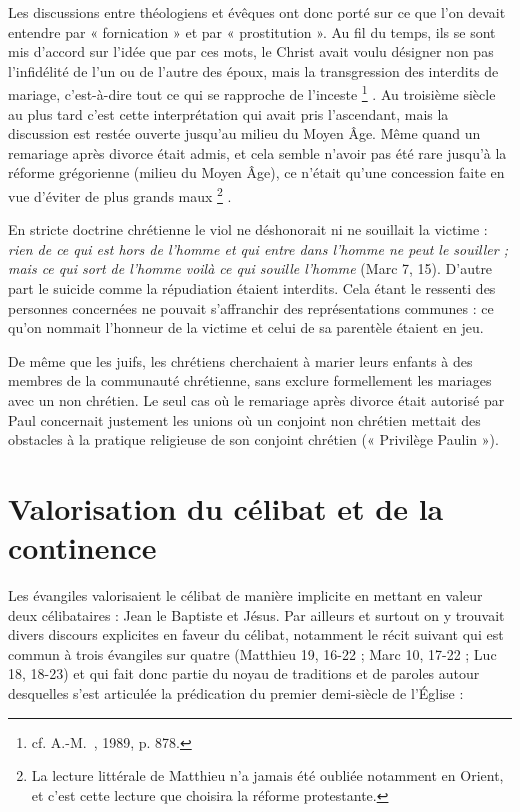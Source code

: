  Les discussions entre théologiens et évêques ont donc porté sur ce que l'on devait entendre par « fornication » et par « prostitution ». Au fil du temps, ils se sont mis d'accord sur l'idée que par ces mots, le Christ avait voulu désigner non pas l'infidélité de l'un ou de l'autre des époux, mais la transgression des interdits de mariage, c'est-à-dire tout ce qui se rapproche de l'inceste%
\footnote{cf. A.-M.~, 1989, p. 878.}%
. Au troisième siècle au plus tard c'est cette interprétation qui avait pris l'ascendant, mais la discussion est restée ouverte jusqu'au milieu du Moyen Âge. Même quand un remariage après divorce était admis, et cela semble n'avoir pas été rare jusqu'à la réforme grégorienne (milieu du Moyen Âge), ce n'était qu'une concession faite en vue d'éviter de plus grands maux%
\footnote{La lecture littérale de Matthieu n'a jamais été oubliée notamment en Orient, et c'est cette lecture que choisira la réforme protestante.}%
.

 En stricte doctrine chrétienne le viol ne déshonorait ni ne souillait la victime : \emph{rien de ce qui est hors de l'homme et qui entre dans l'homme ne peut le souiller ; mais ce qui sort de l'homme voilà ce qui souille l'homme} (Marc 7, 15). D'autre part le suicide comme la répudiation étaient interdits. Cela étant le ressenti des personnes concernées ne pouvait s'affranchir des représentations communes : ce qu'on nommait l'honneur de la victime et celui de sa parentèle étaient en jeu. 

 De même que les juifs, les chrétiens cherchaient à marier leurs enfants à des membres de la communauté chrétienne, sans exclure formellement les mariages avec un non chrétien. Le seul cas où le remariage après divorce était autorisé par Paul concernait justement les unions où un conjoint non chrétien mettait des obstacles à la pratique religieuse de son conjoint chrétien (« Privilège Paulin »).


\section{Valorisation du célibat et de la continence}

 Les évangiles valorisaient le célibat de manière implicite en mettant en valeur deux célibataires : Jean le Baptiste et Jésus. Par ailleurs et surtout on y trouvait divers discours explicites en faveur du célibat, notamment le récit suivant qui est commun à trois évangiles sur quatre (Matthieu 19, 16-22 ; Marc 10, 17-22 ; Luc 18, 18-23) et qui fait donc partie du noyau de traditions et de paroles autour desquelles s'est articulée la prédication du premier demi-siècle de l'Église :

